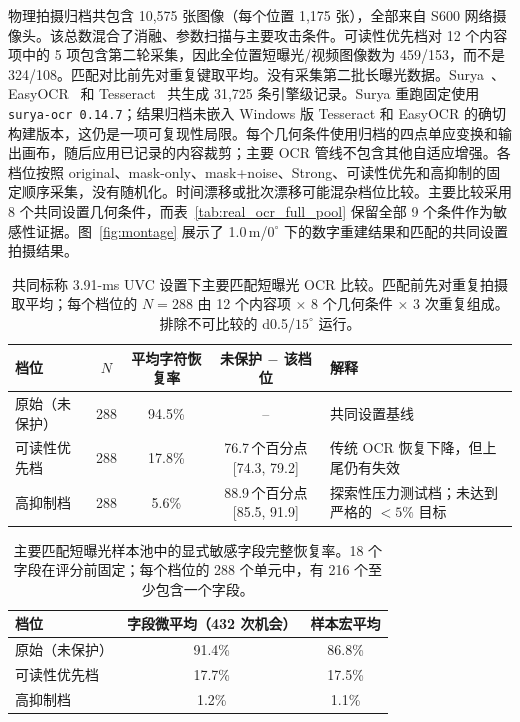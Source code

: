 \documentclass{ieeeaccess}
\begin{document}
物理拍摄归档共包含 10,575 张图像（每个位置 1,175 张），全部来自 S600 网络摄像头。该总数混合了消融、参数扫描与主要攻击条件。可读性优先档对 12 个内容项中的 5 项包含第二轮采集，因此全位置短曝光/视频图像数为 459/153，而不是 324/108。匹配对比前先对重复键取平均。没有采集第二批长曝光数据。Surya~\cite{b_surya2024}、EasyOCR~\cite{b_easyocr2020} 和 Tesseract~\cite{b_smith2007} 共生成 31,725 条引擎级记录。Surya 重跑固定使用 \texttt{surya-ocr 0.14.7}；结果归档未嵌入 Windows 版 Tesseract 和 EasyOCR 的确切构建版本，这仍是一项可复现性局限。每个几何条件使用归档的四点单应变换和输出画布，随后应用已记录的内容裁剪；主要 OCR 管线不包含其他自适应增强。各档位按照 original、mask-only、mask+noise、Strong、可读性优先和高抑制的固定顺序采集，没有随机化。时间漂移或批次漂移可能混杂档位比较。主要比较采用 8 个共同设置几何条件，而表~\ref{tab:real_ocr_full_pool} 保留全部 9 个条件作为敏感性证据。图~\ref{fig:montage} 展示了 1.0\,m/$0^{\circ}$ 下的数字重建结果和匹配的共同设置拍摄结果。

\begin{table}[!t]
\caption{共同标称 3.91-ms UVC 设置下主要匹配短曝光 OCR 比较。匹配前先对重复拍摄取平均；每个档位的 $N=288$ 由 12 个内容项 $\times$ 8 个几何条件 $\times$ 3 次重复组成。排除不可比较的 d0.5/$15^{\circ}$ 运行。}
\label{tab:real_ocr_common}
\centering
\footnotesize
\setlength{\tabcolsep}{4.6pt}
\begin{tabular}{lcccl}
\toprule
档位 & $N$ & 平均字符恢复率 & 未保护 $-$ 该档位 & 解释 \\
\midrule
原始（未保护） & 288 & 94.5\% & -- & 共同设置基线 \\
可读性优先档 & 288 & 17.8\% & 76.7\,个百分点 [74.3, 79.2] & 传统 OCR 恢复下降，但上尾仍有失效 \\
高抑制档 & 288 & 5.6\% & 88.9\,个百分点 [85.5, 91.9] & 探索性压力测试档；未达到严格的 $<5\%$ 目标 \\
\bottomrule
\end{tabular}
\end{table}

\begin{table}[!t]
\caption{主要匹配短曝光样本池中的显式敏感字段完整恢复率。18 个字段在评分前固定；每个档位的 288 个单元中，有 216 个至少包含一个字段。}
\label{tab:explicit_fields}
\centering
\footnotesize
\begin{tabular}{lcc}
\toprule
档位 & 字段微平均（432 次机会） & 样本宏平均 \\
\midrule
原始（未保护） & 91.4\% & 86.8\% \\
可读性优先档 & 17.7\% & 17.5\% \\
高抑制档 & 1.2\% & 1.1\% \\
\bottomrule
\end{tabular}
\end{table}
\end{document}
